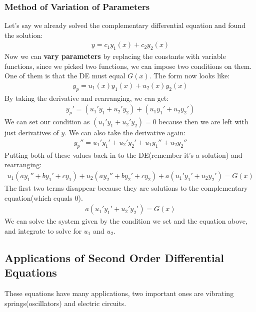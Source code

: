 \documentclass{article}
\begin{document}
\subsubsection{Method of Variation of Parameters}
Let's say we already solved the complementary differential equation and found the solution:
\begin{gather*}
    y = c_1y_1(x) + c_2y_2(x)
\end{gather*}
Now we can \textbf{vary parameters} by replacing the constants with variable functions, since we picked two functions, we can impose two conditions on them. One of them is that the DE must equal $G(x)$. The form now looks like:
\begin{gather*}
    y_p = u_1(x)y_1(x) + u_2(x)y_2(x)
\end{gather*}
By taking the derivative and rearranging, we can get:
\begin{gather*}
    y_p' = (u_1'y_1 + u_2'y_2) + (u_1y_1' + u_2y_2')
\end{gather*}
We can set our condition as $(u_1'y_1 + u_2'y_2) = 0$ because then we are left with just derivatives of $y$. We can also take the derivative again:
\begin{gather*}
    y_p'' = u_1'y_1' + u_2'y_2' + u_1y_1'' + u_2y_2''
\end{gather*}
Putting both of these values back in to the DE(remember it's a solution) and rearranging:
\begin{gather*}
    u_1(ay_1'' + by_1' + cy_1) + u_2(ay_2'' + by_2' + cy_2) + a(u_1'y_1' + u_2y_2') = G(x)
\end{gather*}
The first two terms disappear because they are solutions to the complementary equation(which equals $0$).
\begin{gather*}
    a(u_1'y_1' + u_2'y_2') = G(x)
\end{gather*}
We can solve the system given by the condition we set and the equation above, and integrate to solve for $u_1$ and $u_2$.
\subsection{Applications of Second Order Differential Equations}
These equations have many applications, two important ones are vibrating springs(oscillators) and electric circuits.
\end{document}
